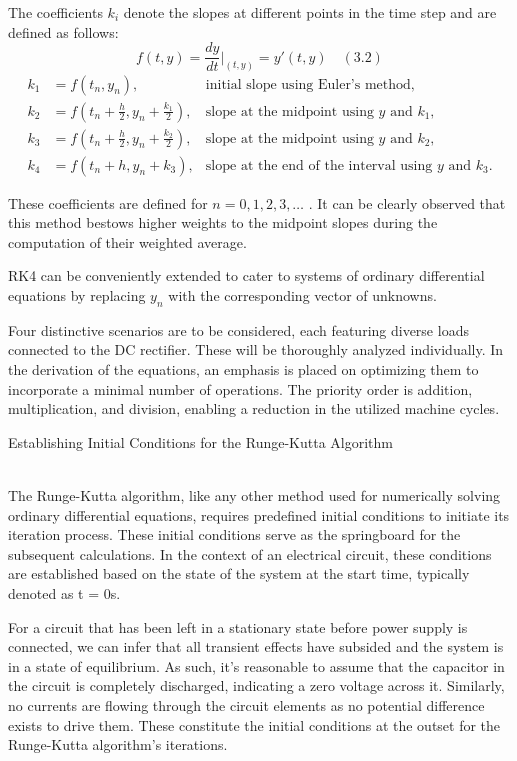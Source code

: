 The coefficients $k_i$ denote the slopes at different points in the time step and are defined as follows:
\begin{equation}
f(t, y) = \frac{dy}{dt}\bigg|_{(t, y)} = y'(t, y) \quad (3.2)
\end{equation}
\begin{align*}
k_1 &= f(t_n, y_n), &\text{initial slope using Euler's method},\\
k_2 &= f \left(t_n + \frac{h}{2}, y_n + \frac{k_1}{2}\right), &\text{slope at the midpoint using $y$ and $k_1$},\\
k_3 &= f \left(t_n + \frac{h}{2}, y_n + \frac{k_2}{2}\right), &\text{slope at the midpoint using $y$ and $k_2$},\\
k_4 &= f(t_n + h, y_n + k_3), &\text{slope at the end of the interval using $y$ and $k_3$}.
\end{align*}

These coefficients are defined for $n = 0, 1, 2, 3, \ldots$ . It can be clearly observed that this method bestows higher weights to the midpoint slopes during the computation of their weighted average.

RK4 can be conveniently extended to cater to systems of ordinary differential equations by replacing $y_n$ with the corresponding vector of unknowns.

Four distinctive scenarios are to be considered, each featuring diverse loads connected to the DC rectifier. These will be thoroughly analyzed individually. In the derivation of the equations, an emphasis is placed on optimizing them to incorporate a minimal number of operations. The priority order is addition, multiplication, and division, enabling a reduction in the utilized machine cycles.

\begin{center}
 Establishing Initial Conditions for the Runge-Kutta Algorithm
\end{center}\\

The Runge-Kutta algorithm, like any other method used for numerically solving ordinary differential equations, requires predefined initial conditions to initiate its iteration process. These initial conditions serve as the springboard for the subsequent calculations. In the context of an electrical circuit, these conditions are established based on the state of the system at the start time, typically denoted as t = 0s.

For a circuit that has been left in a stationary state before power supply is connected, we can infer that all transient effects have subsided and the system is in a state of equilibrium. As such, it's reasonable to assume that the capacitor in the circuit is completely discharged, indicating a zero voltage across it. Similarly, no currents are flowing through the circuit elements as no potential difference exists to drive them. These constitute the initial conditions at the outset for the Runge-Kutta algorithm's iterations.


